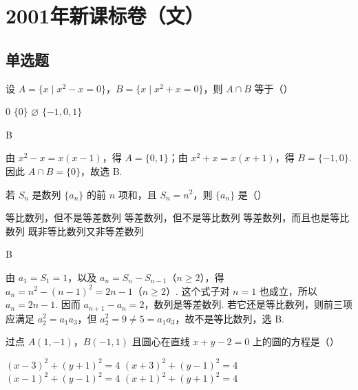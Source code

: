 
\chapter{2001年新课标卷（文）}
\section{单选题}
\begin{problem}
设 \(A = \{x \mid x^2 - x = 0\}\)，\(B = \{x \mid x^2 + x = 0\}\)，则 \(A \cap B\) 等于（\quad）

\choices
    {\(0\)}
    {\(\{0\}\)}
    {\(\varnothing\)}
    {\(\{-1,0,1\}\)}
\end{problem}

\begin{answer}
B
\end{answer}

\begin{solution}
由 \(x^2-x=x(x-1)\)，得 \(A=\{0,1\}\)；由 \(x^2+x=x(x+1)\)，得 \(B=\{-1,0\}\). 因此 \(A\cap B=\{0\}\)，故选 B.
\end{solution}

\begin{problem}
若 \(S_n\) 是数列 \(\{a_n\}\) 的前 \(n\) 项和，且 \(S_n = n^2\)，则 \(\{a_n\}\) 是（\quad）

\choices
    {等比数列，但不是等差数列}
    {等差数列，但不是等比数列}
    {等差数列，而且也是等比数列}
    {既非等比数列又非等差数列}
\end{problem}

\begin{answer}
B
\end{answer}

\begin{solution}
由 \(a_1=S_1=1\)，以及 \(a_n=S_n-S_{n-1}\)（\(n\geq2\)），得
\(a_n=n^2-(n-1)^2=2n-1\)（\(n\geq2\)）. 这个式子对 \(n=1\) 也成立，所以 \(a_n=2n-1\). 因而 \(a_{n+1}-a_n=2\)，数列是等差数列. 若它还是等比数列，则前三项应满足 \(a_2^2=a_1a_3\)，但 \(a_2^2=9\neq5=a_1a_3\)，故不是等比数列，选 B.
\end{solution}

\begin{problem}
过点 \(A(1,-1)\)，\(B(-1,1)\) 且圆心在直线 \(x + y - 2 = 0\) 上的圆的方程是（\quad）

\choices
    {\((x - 3)^2 + (y + 1)^2 = 4\)}
    {\((x + 3)^2 + (y - 1)^2 = 4\)}
    {\((x - 1)^2 + (y - 1)^2 = 4\)}
    {\((x + 1)^2 + (y + 1)^2 = 4\)}
\end{problem}

